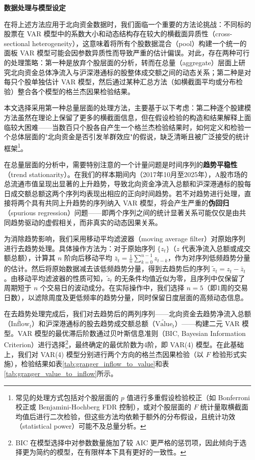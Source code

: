\documentclass{article}
\begin{document}
\vspace{0.5em}
\noindent\textbf{数据处理与模型设定}

在将上述方法应用于北向资金数据时，我们面临一个重要的方法论挑战：不同标的股票在 VAR 模型中的系数大小和动态结构存在较大的横截面异质性（cross-sectional heterogeneity），这意味着将所有个股数据混合（pool）构建一个统一的面板 VAR 模型可能会因参数异质性而导致严重的估计偏误。对此，存在两种可行的处理策略：第一种是放弃个股层面的分析，转而在总量（aggregate）层面上研究北向资金总体净流入与沪深港通标的股整体成交额之间的动态关系；第二种是对每只个股单独估计 VAR 模型，然后通过某种汇总方法（如横截面平均或分布检验）整合各个模型的格兰杰因果检验结果。

本文选择采用第一种总量层面的处理方法，主要基于以下考虑：第二种逐个股建模方法虽然在理论上保留了更多的横截面信息，但在假设检验的构造和结果解释上面临较大困难——当数百只个股各自产生一个格兰杰检验结果时，如何定义和检验一个总体层面的"北向资金是否引发羊群效应"的假说，缺乏清晰且被广泛接受的统计框架\footnote{常见的处理方式包括对个股层面的 $p$ 值进行多重假设检验校正（如 Bonferroni 校正或 Benjamini-Hochberg FDR 控制），或对个股层面的 $F$ 统计量取横截面均值后进行二次检验，但这些方法均依赖于额外的分布假设，且统计功效（statistical power）可能不及总量分析。}。

在总量层面的分析中，需要特别注意的一个计量问题是时间序列的\textbf{趋势平稳性}（trend stationarity）。在我们的样本期间内（2017年10月至2025年），A股市场的总流通市值呈现出显著的上升趋势，导致北向资金净流入总额和沪深港通标的股每日成交额总额这两个序列均表现出相应的正向时间趋势。若不对趋势进行处理，直接将两个具有共同上升趋势的序列纳入 VAR 模型，将会产生严重的\textbf{伪回归}（spurious regression）问题——即两个序列之间的统计显著关系可能仅仅是由共同趋势驱动的虚假相关，而非真实的动态因果关系。

为消除趋势影响，我们采用移动平均滤波器（moving average filter）对原始序列进行去趋势处理。具体操作方法为：对于原始序列 $\{z_t\}$（$z$ 代表净流入总额或成交额总额），计算其 $n$ 阶向后移动平均 $\bar{z}_t = \frac{1}{n}\sum_{k=0}^{n-1}z_{t-k}$，作为对序列低频趋势分量的估计。然后将原始数据减去该低频趋势分量，得到去趋势后的序列 $\tilde{z}_t = z_t - \bar{z}_t$。由移动平均滤波器的性质可知，$\tilde{z}_t$ 的无条件均值近似为零，且序列中仅保留了周期短于 $n$ 个交易日的波动成分。在实际操作中，我们选择 $n = 5$（即1周的交易日数），以滤除周度及更低频率的趋势分量，同时保留日度层面的高频动态信息。

在去趋势处理完成后，我们对去趋势后的两列序列——北向资金去趋势净流入总额（$\widetilde{\text{Inflow}}_t$）和沪深港通标的股去趋势成交额总额（$\widetilde{\text{Value}}_t$）——构建二元 VAR 模型。VAR 模型的最优滞后阶数通过贝叶斯信息准则（BIC, Bayesian Information Criterion）进行选择\footnote{BIC 在模型选择中对参数数量施加了较 AIC 更严格的惩罚项，因此倾向于选择更为简约的模型，在有限样本下具有更好的一致性。}，最终确定的最优阶数为4阶，即 VAR(4) 模型。在此基础上，我们对 VAR(4) 模型分别进行两个方向的格兰杰因果检验（以 $F$ 检验形式实施），检验结果如表\ref{tab:granger_inflow_to_value}和表\ref{tab:granger_value_to_inflow}所示。
\end{document}
